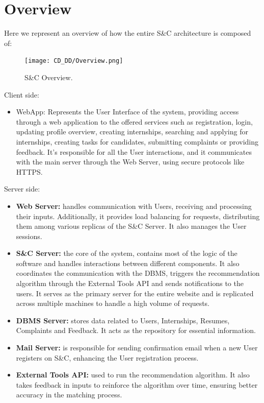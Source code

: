 \section{Overview}
\label{sec:overview}%
Here we represent an overview of how the entire S\&C architecture is composed of:

\begin{figure}[H]
    \begin{center}
        \texttt{[image: CD\_DD/Overview.png]}
        \caption{S\&C Overview.}
        \label{fig:CKB_overview}%
    \end{center}
\end{figure}

\noindent Client side:
\begin{itemize}
    \item WebApp: Represents the User Interface of the system, providing access through a web application to the offered services such as registration, login, updating profile overview, creating internships, searching and applying for internships, creating tasks for candidates, submitting complaints or providing feedback. It’s responsible for all the User interactions, and it communicates with the main server through the Web Server, using secure protocols like HTTPS.
\end{itemize}
\noindent Server side:
\begin{itemize}
    \item \textbf{Web Server:} handles communication with Users, receiving and processing their inputs. Additionally, it provides load balancing for requests, distributing them among various replicas of the S\&C Server. It also manages the User sessions.
    \item \textbf{S\&C Server:} the core of the system, contains most of the logic of the software and handles interactions between different components. It also coordinates the communication with the DBMS, triggers the recommendation algorithm through the External Tools API and sends notifications to the users. It serves as the primary server for the entire website and is replicated across multiple machines to handle a high volume of requests.
    \item \textbf{DBMS Server:} stores data related to Users, Internships, Resumes, Complaints and Feedback. It acts as the repository for essential information.
    \item \textbf{Mail Server:} is responsible for sending confirmation email when a new User registers on S\&C, enhancing the User registration process.
    \item \textbf{External Tools API:} used to run the recommendation algorithm. It also takes feedback in inputs to reinforce the algorithm over time, ensuring better accuracy in the matching process.
\end{itemize}

